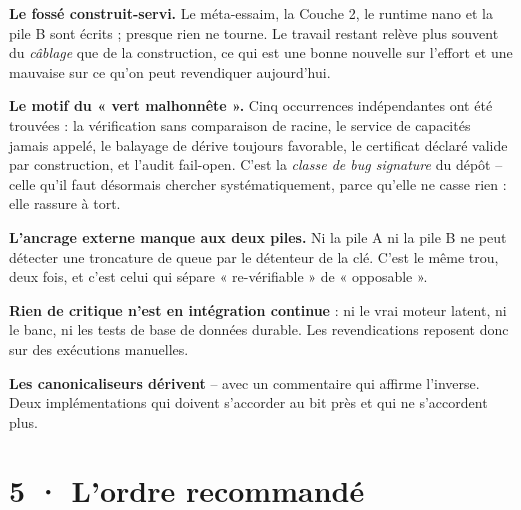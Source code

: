 \documentclass[10pt]{article}
\begin{document}
\textbf{Le fossé construit-servi.} Le méta-essaim, la Couche 2, le runtime nano et la pile B sont
écrits ; presque rien ne tourne. Le travail restant relève plus souvent du \emph{câblage} que de la
construction, ce qui est une bonne nouvelle sur l'effort et une mauvaise sur ce qu'on peut revendiquer
aujourd'hui.

\textbf{Le motif du « vert malhonnête ».} Cinq occurrences indépendantes ont été trouvées : la
vérification sans comparaison de racine, le service de capacités jamais appelé, le balayage de dérive
toujours favorable, le certificat déclaré valide par construction, et l'audit fail-open. C'est la
\emph{classe de bug signature} du dépôt -- celle qu'il faut désormais chercher systématiquement, parce
qu'elle ne casse rien : elle rassure à tort.

\textbf{L'ancrage externe manque aux deux piles.} Ni la pile A ni la pile B ne peut détecter une
troncature de queue par le détenteur de la clé. C'est le même trou, deux fois, et c'est celui qui sépare
« re-vérifiable » de « opposable ».

\textbf{Rien de critique n'est en intégration continue} : ni le vrai moteur latent, ni le banc, ni les
tests de base de données durable. Les revendications reposent donc sur des exécutions manuelles.

\textbf{Les canonicaliseurs dérivent} -- avec un commentaire qui affirme l'inverse. Deux implémentations
qui doivent s'accorder au bit près et qui ne s'accordent plus.

\section{5 · L'ordre recommandé}
\end{document}
